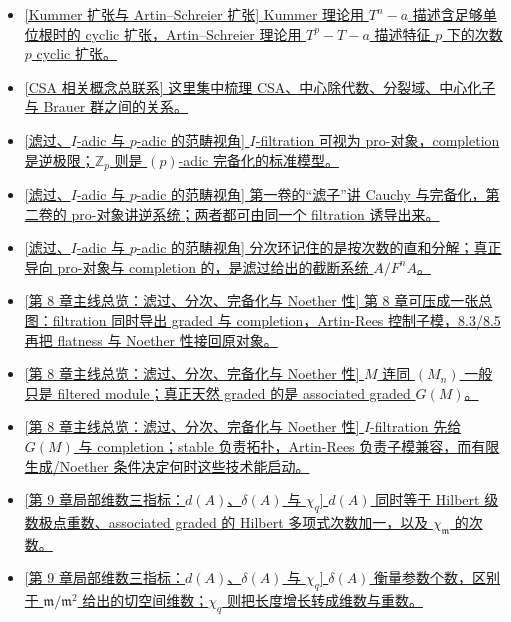 \documentclass[a4paper]{ctexart}
\theoremstyle{definition}
\theoremstyle{analysis}
\theoremstyle{plain}
\begin{document}
\begin{itemize}
  \item \hyperref[subsec:topic-kummer-artin-schreier]{[Kummer 扩张与 Artin--Schreier 扩张] Kummer 理论用 \(T^n-a\) 描述含足够单位根时的 cyclic 扩张，Artin--Schreier 理论用 \(T^p-T-a\) 描述特征 \(p\) 下的次数 \(p\) cyclic 扩张。}
  \item \hyperref[subsec:topic-csa]{[CSA 相关概念总联系] 这里集中梳理 CSA、中心除代数、分裂域、中心化子与 Brauer 群之间的关系。}
  \item \hyperref[rem:iadic-padic]{[\hyperref[subsec:topic-filtration-adic]{滤过、\(I\)-adic 与 \(p\)-adic 的范畴视角}] \(I\)-filtration 可视为 pro-对象，completion 是逆极限；\(\mathbb Z_p\) 则是 \((p)\)-adic 完备化的标准模型。}
  \item \hyperref[rem:filter-vs-filtration]{[\hyperref[subsec:topic-filtration-adic]{滤过、\(I\)-adic 与 \(p\)-adic 的范畴视角}] 第一卷的“滤子”讲 Cauchy 与完备化，第二卷的 pro-对象讲逆系统；两者都可由同一个 filtration 诱导出来。}
  \item \hyperref[rem:graded-filtered-completion]{[\hyperref[subsec:topic-filtration-adic]{滤过、\(I\)-adic 与 \(p\)-adic 的范畴视角}] 分次环记住的是按次数的直和分解；真正导向 pro-对象与 completion 的，是滤过给出的截断系统 \(A/F^nA\)。}
  \item \hyperref[rem:ch8-roadmap]{[\hyperref[subsec:topic-ch8-roadmap]{第 8 章主线总览：滤过、分次、完备化与 Noether 性}] 第 8 章可压成一张总图：filtration 同时导出 graded 与 completion，Artin-Rees 控制子模，8.3/8.5 再把 flatness 与 Noether 性接回原对象。}
  \item \hyperref[subsec:topic-ch8-roadmap]{[第 8 章主线总览：滤过、分次、完备化与 Noether 性] \(M\) 连同 \((M_n)\) 一般只是 filtered module；真正天然 graded 的是 associated graded \(G(M)\)。}
  \item \hyperref[subsec:topic-ch8-roadmap]{[第 8 章主线总览：滤过、分次、完备化与 Noether 性] \(I\)-filtration 先给 \(G(M)\) 与 completion；stable 负责拓扑，Artin-Rees 负责子模兼容，而有限生成/Noether 条件决定何时这些技术能启动。}
  \item \hyperref[rem:local-dimension-invariants]{[\hyperref[subsec:topic-local-dimension-invariants]{第 9 章局部维数三指标：\(d(A)\)、\(\delta(A)\) 与 \(\chi_q\)}] \(d(A)\) 同时等于 Hilbert 级数极点重数、associated graded 的 Hilbert 多项式次数加一，以及 \(\chi_{\mathfrak m}\) 的次数。}
  \item \hyperref[subsec:topic-local-dimension-invariants]{[第 9 章局部维数三指标：\(d(A)\)、\(\delta(A)\) 与 \(\chi_q\)] \(\delta(A)\) 衡量参数个数，区别于 \(\mathfrak m/\mathfrak m^2\) 给出的切空间维数；\(\chi_q\) 则把长度增长转成维数与重数。}

\end{itemize}
\end{document}
